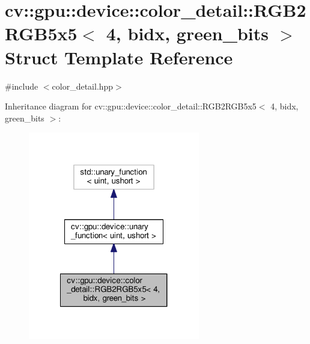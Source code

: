 \hypertarget{structcv_1_1gpu_1_1device_1_1color__detail_1_1RGB2RGB5x5_3_014_00_01bidx_00_01green__bits_01_4}{\section{cv\-:\-:gpu\-:\-:device\-:\-:color\-\_\-detail\-:\-:R\-G\-B2\-R\-G\-B5x5$<$ 4, bidx, green\-\_\-bits $>$ Struct Template Reference}
\label{structcv_1_1gpu_1_1device_1_1color__detail_1_1RGB2RGB5x5_3_014_00_01bidx_00_01green__bits_01_4}
}


{\ttfamily \#include $<$color\-\_\-detail.\-hpp$>$}



Inheritance diagram for cv\-:\-:gpu\-:\-:device\-:\-:color\-\_\-detail\-:\-:R\-G\-B2\-R\-G\-B5x5$<$ 4, bidx, green\-\_\-bits $>$\-:\nopagebreak
\begin{figure}[H]
\begin{center}
\leavevmode
\includegraphics[width=212pt]{structcv_1_1gpu_1_1device_1_1color__detail_1_1RGB2RGB5x5_3_014_00_01bidx_00_01green__bits_01_4__inherit__graph}
\end{center}
\end{figure}


